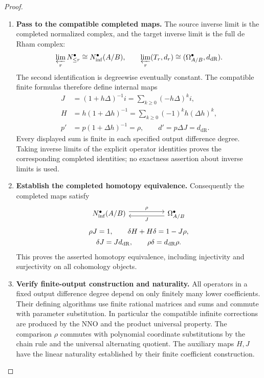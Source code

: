 \documentclass[11pt,a4paper]{article}
\numberwithin{algorithm}{section}
\numberwithin{equation}{section}
\theoremstyle{definition}
\theoremstyle{remark}
\theoremstyle{plain}
\theoremstyle{definition}
\theoremstyle{plain}
\begin{document}
\begin{proof}
\begin{enumerate}[leftmargin=*,align=left]
\item \textbf{Pass to the compatible completed maps.}
The source inverse limit is the completed normalized complex,
and the target inverse limit is the full de Rham complex:
\[
 \varprojlim_r N_{\le r}^\bullet
   \cong N^\bullet_{\mathrm{inf}}(A/B),\qquad
 \varprojlim_r(T_r,d_r)
   \cong(\Omega^\bullet_{A/B},d_{\mathrm{dR}}).
\]
The second identification is degreewise eventually constant.
The compatible finite formulas therefore define internal maps
\begin{equation}\label{eq:completed-perturbation-maps}
 \begin{aligned}
 J&=(1+h\Delta)^{-1}i
   =\sum_{k\ge0}(-h\Delta)^k i,\\
 H&=h(1+\Delta h)^{-1}
   =\sum_{k\ge0}(-1)^k h(\Delta h)^k,\\
 p'&=p(1+\Delta h)^{-1}=\rho,\qquad
 d'=p\Delta J=d_{\mathrm{dR}}.
 \end{aligned}
\end{equation}
Every displayed sum is finite in each specified output
difference degree. Taking inverse limits of the explicit
operator identities proves the corresponding completed
identities; no exactness assertion about inverse limits is used.

\item \textbf{Establish the completed homotopy equivalence.}
Consequently the completed maps satisfy
\begin{equation}\label{eq:completed-derham-retraction}
\begin{gathered}
\begin{tikzcd}[column sep=5em]
 N^\bullet_{\mathrm{inf}}(A/B)
   \arrow[r,shift left=.7ex,"{\rho}"]
   & \Omega^\bullet_{A/B} \arrow[l,shift left=.7ex,"{J}"]
\end{tikzcd}\\[.7ex]
 \rho J=1,\qquad \delta H+H\delta=1-J\rho,\\
 \delta J=Jd_{\mathrm{dR}},\qquad
 \rho\delta=d_{\mathrm{dR}}\rho.
\end{gathered}
\end{equation}
This proves the asserted homotopy equivalence, including
injectivity and surjectivity on all cohomology objects.

\item \textbf{Verify finite-output construction and naturality.}
All operators in a fixed output difference degree depend on only
finitely many lower coefficients.  Their defining algorithms use
finite rational matrices and sums and commute with parameter
substitution.  In particular the compatible infinite corrections
are produced by the NNO and the product universal property.
The comparison $\rho$ commutes with polynomial coordinate substitutions by the chain rule and the universal alternating quotient. The auxiliary maps $H,J$ have the linear naturality established by their finite coefficient construction.


\end{enumerate}
\end{proof}
\end{document}
